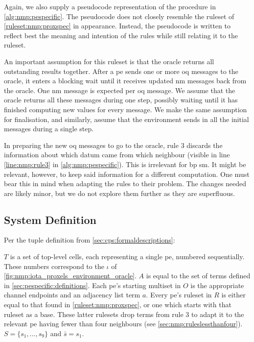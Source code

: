 Again, we also supply a pseudocode representation of the procedure in \cref{alg:nmp:pespecific}.  The pseudocode does not closely resemble the ruleset of \cref{ruleset:nmp:proxspec} in appearance.  Instead, the pseudocode is written to reflect best the meaning and intention of the rules while still relating it to the ruleset.

An important assumption for this ruleset is that the oracle returns all outstanding results together.  After a \gls{pe} sends one or more \gls{oq} messages to the oracle, it enters a blocking wait until it receives updated \gls{nm} messages back from the oracle.  One \gls{nm} message is expected per \gls{oq} message.  We assume that the oracle returns all these messages during one step, possibly waiting until it has finished computing new values for every message.  We make the same assumption for finalisation, and similarly, assume that the environment sends in all the initial messages during a single step.

In preparing the new \gls{oq} messages to go to the oracle, rule 3 discards the information about which datum came from which neighbour (visible in line \ref{line:nmp:rule3} in \cref{alg:nmp:pespecific}).  This is irrelevant for \gls{bp} \gls{sm}.  It might be relevant, however, to keep said information for a different computation.  One must bear this in mind when adapting the rules to their problem.  The changes needed are likely minor, but we do not explore them further as they are superfluous.

\subsection{System Definition}
Per the tuple definition from \cref{sec:cps:formaldescriptions}:

\(T\) is a set of top-level cells, each representing a single \gls{pe}, numbered sequentially.  These numbers correspond to the \(\iota\) of \cref{fig:nmp:iota_proxels_environment_oracle}.  \(A\) is equal to the set of terms defined in \cref{sec:pespecific:definitions}.  Each \gls{pe}'s starting multiset in \(O\) is the appropriate channel endpoints and an adjacency list term \(a\).  Every \gls{pe}'s ruleset in \(R\) is either equal to that found in \cref{ruleset:nmp:proxspec}, or one which starts with that ruleset as a base.  These latter rulesets drop terms from rule 3 to adapt it to the relevant \gls{pe} having fewer than four neighbours (see \cref{sec:nmp:ruleslessthanfour}).  \(S = \{s_1, \dots, s_9\}\) and \(\bar{s} = s_1\).


